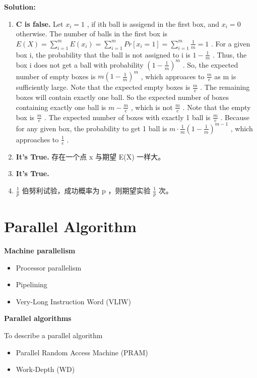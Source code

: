 \documentclass{article}
\begin{document}
\textbf{Solution:}
\begin{enumerate}
    \item \textbf{C is false.}
    \subitem [A] Let $x_i = 1$ , if ith ball is assigend in the first box, and $x_i=0$ otherwise. The number of balls in the first box is $E(X) = \sum\limits_{i=1}^m E(x_i) = \sum\limits_{i=1}^m Pr[x_i = 1] = \sum\limits_{i=1}^m \frac{1}{m} = 1$ .
    \subitem [B] For a given box i, the probability that the ball is not assigned to i is $1 - \frac{1}{m}$ . Thus, the box i does not get a ball with probability $(1 - \frac{1}{m})^m$ . So, the expected number of empty boxes is $m(1 - \frac{1}{m})^m$ , which approaces to $\frac{m}{e}$ as m is sufficiently large.
    \subitem [C] Note that the expected empty boxes is $\frac{m}{e}$ . The remaining boxes will contain exactly one ball. So the expected number of boxes containing exactly one ball is $m - \frac{m}{e}$ , which is not $\frac{m}{e}$ .
    \subitem [D] Note that the empty box is $\frac{m}{e}$ . The expected number of boxes with exactly 1 ball is $\frac{m}{e}$ . Because for any given box, the probability to get 1 ball is $m \cdot \frac{1}{m} (1 - \frac{1}{m})^{m-1}$ , which approaches to $\frac{1}{e}$ . 
    \item \textbf{It's True.} 存在一个点 x 与期望 E(X) 一样大。
    \item \textbf{It's True.}
    \item \textbf{$\frac{1}{p}$} 伯努利试验，成功概率为 p ，则期望实验 $\frac{1}{p}$ 次。
\end{enumerate}

\newpage

\section{Parallel Algorithm}

\textbf{Machine parallelism}
\begin{itemize}
    \item Processor parallelism
    \item Pipelining
    \item Very-Long Instruction Word (VLIW)
\end{itemize}

\textbf{Parallel algorithms}

To describe a parallel algorithm
\begin{itemize}
    \item Parallel Random Access Machine (PRAM)
    \item Work-Depth (WD)
\end{itemize}
\end{document}
